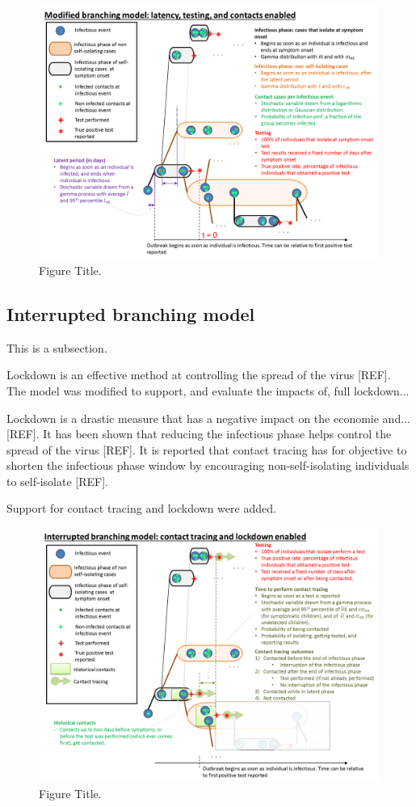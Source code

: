 \documentclass[sr]{drdc-report}
\begin{document}
\begin{figure}
  \includegraphics[width=0.99\textwidth, keepaspectratio=true]{figures/ModifiedBranchingModel}
  \caption{Figure Title.}\label{fig_branchingModel}
\end{figure}

\subsection{Interrupted branching model}
This is a subsection.

Lockdown is an effective method at controlling the spread of the virus [REF]. The model was modified to support, and evaluate the impacts of, full lockdown... 

Lockdown is a drastic measure that has a negative impact on the economie and... [REF]. It has been shown that reducing the infectious phase helps control the spread of the virus [REF]. It is reported that contact tracing has for objective to shorten the infectious phase window by encouraging non-self-isolating individuals to self-isolate [REF]. 

Support for contact tracing and lockdown were added. 

\begin{figure}
  \includegraphics[width=0.99\textwidth, keepaspectratio=true]{figures/InterruptedBranchingModel}
  \caption{Figure Title.}\label{fig_branchingModel}
\end{figure}
\end{document}
